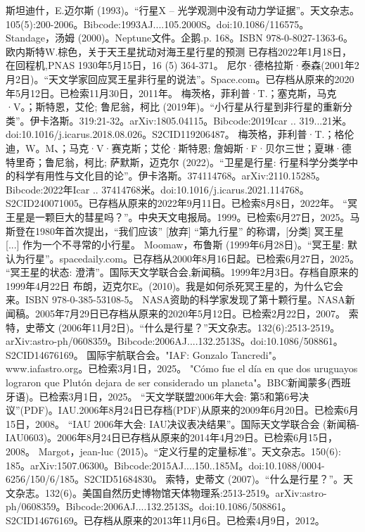\begin{enumerate}
 斯坦迪什，E.迈尔斯 (1993)。“行星X -- 光学观测中没有动力学证据”。天文杂志。105(5):200-2006。Bibcode:1993AJ....105.2000S。doi:10.1086/116575。
 Standage，汤姆 (2000)。Neptune文件。企鹅.p. 168。ISBN 978-0-8027-1363-6。
 欧内斯特W.棕色，关于天王星扰动对海王星行星的预测 已存档2022年1月18日，在回程机,PNAS 1930年5月15日，16 (5) 364-371。
 尼尔·德格拉斯·泰森(2001年2月2日)。“天文学家回应冥王星非行星的说法”。Space.com。已存档从原来的2020年5月12日。已检索11月30日，2011年。
 梅茨格，菲利普·T.；塞克斯，马克·V。；斯特恩，艾伦; 鲁尼翁，柯比 (2019年)。“小行星从行星到非行星的重新分类”。伊卡洛斯。319:21-32。arXiv:1805.04115。Bibcode:2019Icar .. 319...21米。doi:10.1016/j.icarus.2018.08.026。S2CID119206487。 
 梅茨格，菲利普·T.；格伦迪，W。M、；马克·V·赛克斯；艾伦·斯特恩; 詹姆斯·F·贝尔三世；夏琳·德特里奇；鲁尼翁，柯比; 萨默斯，迈克尔 (2022)。“卫星是行星: 行星科学分类学中的科学有用性与文化目的论”。伊卡洛斯。374114768。arXiv:2110.15285。Bibcode:2022年Icar .. 37414768米。doi:10.1016/j.icarus.2021.114768。S2CID240071005。已存档从原来的2022年9月11日。已检索8月8日，2022年。 
 “冥王星是一颗巨大的彗星吗？”。中央天文电报局。1999。已检索6月27日，2025。马斯登在1980年首次提出，“我们应该” [放弃] “第九行星” 的称谓，[分类] 冥王星 [...] 作为一个不寻常的小行星。
 Moomaw，布鲁斯 (1999年6月28日)。“冥王星: 默认为行星”。spacedaily.com。已存档从2000年8月16日起。已检索6月27日，2025。
 “冥王星的状态: 澄清”。国际天文学联合会,新闻稿。1999年2月3日。存档自原来的1999年4月22日
 布朗，迈克尔E。(2010)。我是如何杀死冥王星的，为什么它会来。ISBN 978-0-385-53108-5。
 NASA资助的科学家发现了第十颗行星。NASA新闻稿。2005年7月29日已存档从原来的2020年5月12日。已检索2月22日，2007。
 索特，史蒂文 (2006年11月2日)。“什么是行星？”天文杂志。132(6):2513-2519。arXiv:astro-ph/0608359。Bibcode:2006AJ....132.2513S。doi:10.1086/508861。S2CID14676169。 
 国际宇航联合会。"IAF: Gonzalo Tancredi"。www.iafastro.org。已检索3月1日，2025。
 "Cómo fue el día en que dos uruguayos lograron que Plutón dejara de ser considerado un planeta"。BBC新闻蒙多(西班牙语)。已检索3月1日，2025。
 “天文学联盟2006年大会: 第5和第6号决议”(PDF)。IAU.2006年8月24日已存档(PDF)从原来的2009年6月20日。已检索6月15日，2008。
 “IAU 2006年大会: IAU决议表决结果”。国际天文学联合会 (新闻稿-IAU0603)。2006年8月24日已存档从原来的2014年4月29日。已检索6月15日，2008。
 Margot，jean-luc (2015)。“定义行星的定量标准”。天文杂志。150(6): 185。arXiv:1507.06300。Bibcode:2015AJ....150..185M。doi:10.1088/0004-6256/150/6/185。S2CID51684830。 
 索特，史蒂文 (2007)。“什么是行星？”。天文杂志。132(6)。美国自然历史博物馆天体物理系:2513-2519。arXiv:astro-ph/0608359。Bibcode:2006AJ....132.2513S。doi:10.1086/508861。S2CID14676169。已存档从原来的2013年11月6日。已检索4月9日，2012。 

\end{enumerate}
